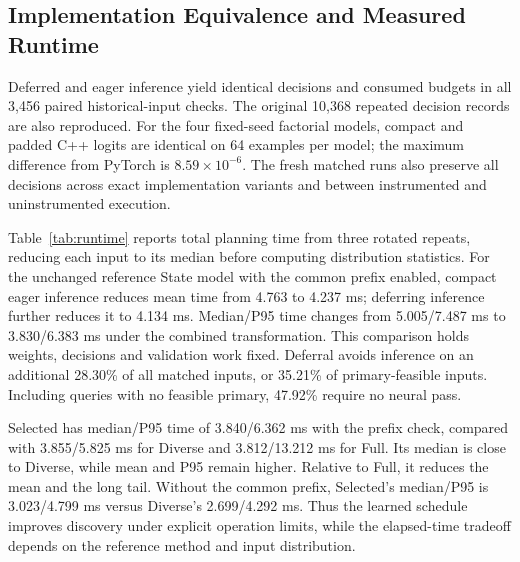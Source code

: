 \documentclass[journal]{IEEEtran}
\begin{document}
\subsection{Implementation Equivalence and Measured Runtime}
Deferred and eager inference yield identical decisions and consumed budgets in all 3,456 paired historical-input checks. The original 10,368 repeated decision records are also reproduced. For the four fixed-seed factorial models, compact and padded C++ logits are identical on 64 examples per model; the maximum difference from PyTorch is $8.59\times10^{-6}$. The fresh matched runs also preserve all decisions across exact implementation variants and between instrumented and uninstrumented execution.

Table~\ref{tab:runtime} reports total planning time from three rotated repeats, reducing each input to its median before computing distribution statistics. For the unchanged reference State model with the common prefix enabled, compact eager inference reduces mean time from 4.763 to 4.237 ms; deferring inference further reduces it to 4.134 ms. Median/P95 time changes from 5.005/7.487 ms to 3.830/6.383 ms under the combined transformation. This comparison holds weights, decisions and validation work fixed. Deferral avoids inference on an additional 28.30\% of all matched inputs, or 35.21\% of primary-feasible inputs. Including queries with no feasible primary, 47.92\% require no neural pass.

Selected has median/P95 time of 3.840/6.362 ms with the prefix check, compared with 3.855/5.825 ms for Diverse and 3.812/13.212 ms for Full. Its median is close to Diverse, while mean and P95 remain higher. Relative to Full, it reduces the mean and the long tail. Without the common prefix, Selected's median/P95 is 3.023/4.799 ms versus Diverse's 2.699/4.292 ms. Thus the learned schedule improves discovery under explicit operation limits, while the elapsed-time tradeoff depends on the reference method and input distribution.
\end{document}
